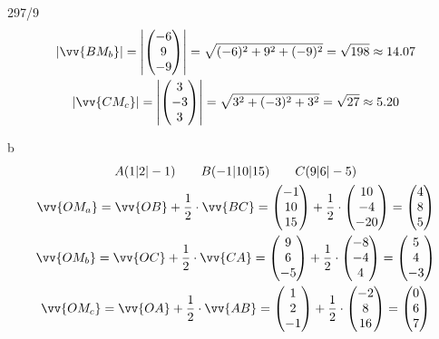 \begin{exercise}{297/9}
\begin{gather*}
    |\vv{BM_b}| = \left|\begin{pmatrix}-6 \\ 9 \\ -9\end{pmatrix}\right| = \sqrt{(-6)^2 + 9^2 + (-9)^2} = \sqrt{198} \approx 14.07 \\
    |\vv{CM_c}| = \left|\begin{pmatrix}3 \\ -3 \\ 3\end{pmatrix}\right| = \sqrt{3^2 + (-3)^2 + 3^2} = \sqrt{27} \approx 5.20
  \end{gather*}
  \item [b]
  \begin{gather*}
    A(1|2|-1) \qquad B(-1|10|15) \qquad C(9|6|-5) \\
    \vv{OM_a} = \vv{OB} + \frac{1}{2} \cdot \vv{BC} = \begin{pmatrix}-1 \\ 10 \\ 15\end{pmatrix} + \frac{1}{2} \cdot \begin{pmatrix}10 \\ -4 \\ -20\end{pmatrix} = \begin{pmatrix}4 \\ 8 \\ 5\end{pmatrix} \\
    \vv{OM_b} = \vv{OC} + \frac{1}{2} \cdot \vv{CA} = \begin{pmatrix}9 \\ 6 \\ -5\end{pmatrix} + \frac{1}{2} \cdot \begin{pmatrix}-8 \\ -4 \\ 4\end{pmatrix} = \begin{pmatrix}5 \\ 4 \\ -3\end{pmatrix} \\
    \vv{OM_c} = \vv{OA} + \frac{1}{2} \cdot \vv{AB} = \begin{pmatrix}1 \\ 2 \\ -1\end{pmatrix} + \frac{1}{2} \cdot \begin{pmatrix}-2 \\ 8 \\ 16\end{pmatrix} = \begin{pmatrix}0 \\ 6 \\ 7\end{pmatrix} \\

\end{gather*}
\end{exercise}
